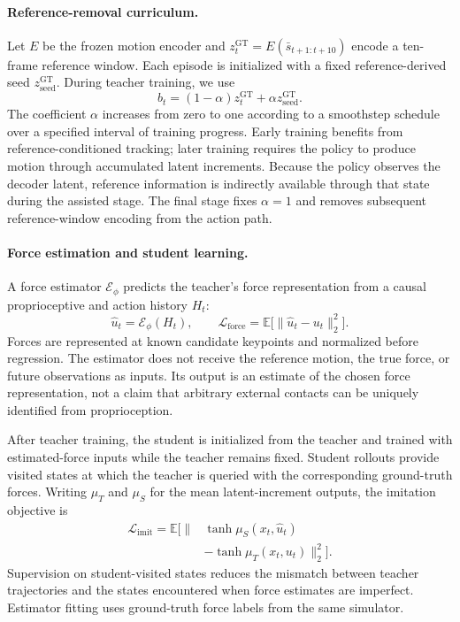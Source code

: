 \paragraph{Reference-removal curriculum.}
\label{sec:latent_curriculum}
Let $E$ be the frozen motion encoder and $z_t^{\mathrm{GT}}=E(\bar{s}_{t+1:t+10})$ encode a ten-frame reference window. Each episode is initialized with a fixed reference-derived seed $z_{\mathrm{seed}}^{\mathrm{GT}}$. During teacher training, we use
\begin{equation}
    b_t=(1-\alpha)z_t^{\mathrm{GT}}
        +\alpha z_{\mathrm{seed}}^{\mathrm{GT}}.
    \label{eq:latent_curriculum}
\end{equation}
The coefficient $\alpha$ increases from zero to one according to a smoothstep schedule over a specified interval of training progress. Early training benefits from reference-conditioned tracking; later training requires the policy to produce motion through accumulated latent increments. Because the policy observes the decoder latent, reference information is indirectly available through that state during the assisted stage. The final stage fixes $\alpha=1$ and removes subsequent reference-window encoding from the action path.

\paragraph{Force estimation and student learning.}
A force estimator $\mathcal E_\phi$ predicts the teacher's force representation from a causal proprioceptive and action history $H_t$:
\begin{equation}
    \hat u_t=\mathcal E_\phi(H_t),
    \qquad
    \mathcal L_{\mathrm{force}}
        =\mathbb E\bigl[\|\hat u_t-u_t\|_2^2\bigr].
    \label{eq:force_estimation}
\end{equation}
Forces are represented at known candidate keypoints and normalized before regression. The estimator does not receive the reference motion, the true force, or future observations as inputs. Its output is an estimate of the chosen force representation, not a claim that arbitrary external contacts can be uniquely identified from proprioception.

After teacher training, the student is initialized from the teacher and trained with estimated-force inputs while the teacher remains fixed. Student rollouts provide visited states at which the teacher is queried with the corresponding ground-truth forces. Writing $\mu_T$ and $\mu_S$ for the mean latent-increment outputs, the imitation objective is
\begin{equation}
    \begin{aligned}
    \mathcal L_{\mathrm{imit}}=\mathbb E\bigl[
    \|&\tanh\mu_S(x_t,\hat u_t) \\
       &-\tanh\mu_T(x_t,u_t)\|_2^2\bigr].
    \end{aligned}
    \label{eq:student_imitation}
\end{equation}
Supervision on student-visited states reduces the mismatch between teacher trajectories and the states encountered when force estimates are imperfect. Estimator fitting uses ground-truth force labels from the same simulator.

